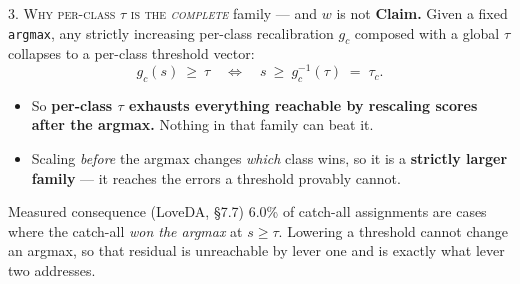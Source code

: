 \documentclass[aspectratio=169]{beamer}
\newcommand{\best}[1]{\textcolor{acc}{\textbf{#1}}}
\newcommand{\bad}[1]{\textcolor{warn}{#1}}
\begin{document}
\begin{frame}{\textsc{3. Why per-class $\tau$ is the \emph{complete}} family --- and $w$ is not}
\textbf{Claim.} Given a fixed \texttt{argmax}, any strictly increasing per-class
recalibration $g_c$ composed with a global $\tau$ collapses to a per-class
threshold vector:
\[
  g_c(s)\ \ge\ \tau \quad\Longleftrightarrow\quad s\ \ge\ g_c^{-1}(\tau)
  \;=\;\tau_c .
\]

\vspace{0.4em}
\begin{itemize}
  \item So \best{per-class $\tau$ exhausts everything reachable by rescaling
        scores after the argmax.} Nothing in that family can beat it.
  \item Scaling \emph{before} the argmax changes \emph{which} class wins, so it
        is a \best{strictly larger family} --- it reaches the errors a threshold
        provably cannot.
\end{itemize}

\vspace{0.6em}
\begin{block}{Measured consequence (LoveDA, \S7.7)}
6.0\% of catch-all assignments are cases where the catch-all \emph{won the
argmax} at $s \ge \tau$. \bad{Lowering a threshold cannot change an argmax},
so that residual is unreachable by lever one and is exactly what lever two
addresses.
\end{block}
\end{frame}

\end{document}
